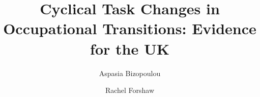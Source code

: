 \documentclass[12pt,authoryear]{elsarticle}
\begin{document}
	
	\begin{frontmatter}
		
		
		
		
		\title{Cyclical Task Changes in Occupational Transitions: Evidence for the UK}
		
		
		\author{Aspasia Bizopoulou }
		\address{VATT Institute for Economic Research, Economicum, Arkadiankatu 7, PL 1279, 00101 Helsinki, Finland}
		
						\author{Rachel Forshaw}
		\address{Heriot-Watt University, Campus The Avenue, Edinburgh, EH14 4AS UK}

		
		
		
		
		
		
		\begin{abstract}


\end{abstract}
\end{frontmatter}
\end{document}
